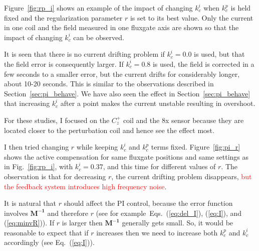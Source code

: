 Figure~\ref{fig:rp_i} shows an example of the impact of changing
$k_c^i$ when $k_c^p$ is held fixed and the regularization parameter
$r$ is set to its best value.  Only the current in one coil and the
field measured in one fluxgate axis are shown so that the impact of
changing $k_c^i$ can be observed.

It is seen that there is no current drifting problem if $k_c^i=0.0$ is
used, but that the field error is consequently larger.  If $k_c^i=0.8$
is used, the field is corrected in a few seconds to a smaller error,
but the current drifts for considerably longer, about 10-20 seconds.
This is similar to the observations described in
Section~\ref{sec:pi_behave}.  We have also seen the effect in
Section~\ref{sec:pi_behave} that increasing $k_c^i$ after a point
makes the current unstable resulting in overshoot.

For these studies, I focused on the $C_z^+$ coil and the 8x sensor
because they are located closer to the perturbation coil and hence see the effect most.



I then tried changing $r$ while keeping $k_c^i$ and $k_c^p$ terms
fixed.  Figure~\ref{fig:pi_r} shows the active compensation for same
fluxgate positions and same settings as in Fig.~\ref{fig:rp_i}, with
$k_c^i=0.37$, and this time for different values of $r$. The
observation is that for decreasing $r$, the current drifting problem
disappears, \textcolor{red}{but the feedback system introduces high frequency noise}.

It is natural that $r$ should affect the PI control, because the error
function involves $\bm{M^{-1}}$ and therefore $r$ (see
for example~Eqs.~(\ref{eq:del_I}), (\ref{eq:I}), and (\ref{eq:minvR})).  If
$r$ is larger then $\bm{M^{-1}}$ generally gets small.  So, it would be
reasonable to expect that if $r$ increases then we need to increase
both $k_c^p$ and $k_c^i$ accordingly (see Eq.~(\ref{eq:I})).


